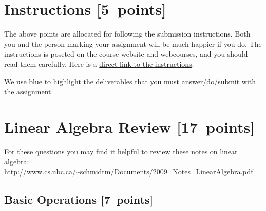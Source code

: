 \documentclass{article}
\newcommand{\blu}[1]{{\textcolor{blu}{#1}}}
\let\ask\blu
\newcommand\pts[1]{\textcolor{pointscolour}{[#1~points]}}
\begin{document}
  \section*{Instructions \pts{5}}

  The above points are allocated for following the submission
  instructions. Both you and the person marking your assignment will be
  much happier if you do. The instructions is poseted on the course
  website and webcourses, and you should read them carefully. Here is a \href{https://www.dropbox.com/scl/fi/s8u1c0b48pjbqpyl1ndno/submission_instructions.pdf?rlkey=skzx0ekx4i03nm9oh84h1tzis&st=fdo6jhf6&raw=1}{direct link to the instructions}.

  \vspace{1em}
  We use \ask{blue} to highlight the deliverables that you must answer/do/submit with the assignment.

  \section{Linear Algebra Review \pts{17}}

  For these questions you may find it helpful to review these notes on linear algebra:\\
  \url{http://www.cs.ubc.ca/~schmidtm/Documents/2009_Notes_LinearAlgebra.pdf}

  \subsection{Basic Operations \pts{7}}
\end{document}
